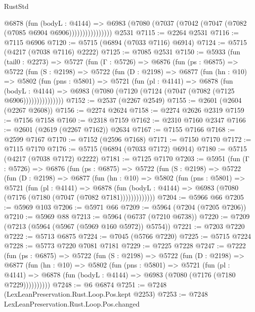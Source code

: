 \begin{lexlean}{RustStd}
\begin{coremodule}
                    @6878
                      (fun (bodyL : @4144) =>
                      @6983 (@7080 (@7037 (@7042 (@7047 (@7082 (@7085 @6904 @6906))))))))))))))))
    @2531
@7115 := @2264 @2531
@7116 := @7115 @6906
@7120 := @5715 (@6894 (@7033 @7116) @6914)
@7124 := @5715 (@4217 (@7038 @7116) @2222)
@7125 := @7085 @2531
@7150 := @5933
    (fun (tail0 : @2273) =>
    @5727
      (fun (Γ : @5726) =>
      @6876
        (fun (ps : @6875) =>
        @5722
          (fun (S : @2198) =>
          @5722
            (fun (D : @2198) =>
            @6877
              (fun (hn : @10) =>
              @5802
                (fun (pns : @5801) =>
                @5721
                  (fun (pl : @4141) =>
                  @6878
                    (fun (bodyL : @4144) =>
                    @6983 (@7080 (@7120 (@7124 (@7047 (@7082 (@7125 @6906)))))))))))))))
@7152 := @2537 (@2267 @2549)
@7155 := @2601 (@2604 (@2267 @2608))
@7156 := @2274 @2624
@7158 := @2274 @2626 @2319
@7159 := @7156 @7158
@7160 := @2318 @7159
@7162 := @2310 @7160 @2347
@7166 := @2601 (@2619 (@2267 @7162)) @2634
@7167 := @7155 @7166
@7168 := @2599 @7167
@7170 := @7152 (@2596 @7168)
@7171 := @7150 @7170
@7172 := @7115 @7170
@7176 := @5715 (@6894 (@7033 @7172) @6914)
@7180 := @5715 (@4217 (@7038 @7172) @2222)
@7181 := @7125 @7170
@7203 := @5951
    (fun (Γ : @5726) =>
    @6876
      (fun (ps : @6875) =>
      @5722
        (fun (S : @2198) =>
        @5722
          (fun (D : @2198) =>
          @6877
            (fun (hn : @10) =>
            @5802
              (fun (pns : @5801) =>
              @5721
                (fun (pl : @4141) =>
                @6878
                  (fun (bodyL : @4144) =>
                  @6983 (@7080 (@7176 (@7180 (@7047 (@7082 @7181)))))))))))))
@7204 := @5966 @66
@7205 := @5969 @103
@7206 := @5971 @66
@7209 := @5964 (@7204 (@7205 @7206))
@7210 := @5969 @88
@7213 := @5964 (@6737 (@7210 @6738))
@7220 := @7209 (@7213 (@5964 (@5967 (@5969 @160 @5972)) @5754))
@7221 := @7203 @7220
@7222 := @5713 @6875
@7224 := @7045 (@5766 @7220)
@7225 := @5715 @7224
@7228 := @5773 @7220 @7081 @7181
@7229 := @7225 @7228
@7247 := @7222
    (fun (ps : @6875) =>
    @5722
      (fun (S : @2198) =>
      @5722
        (fun (D : @2198) =>
        @6877
          (fun (hn : @10) =>
          @5802
            (fun (pns : @5801) =>
            @5721
              (fun (pl : @4141) =>
              @6878 (fun (bodyL : @4144) => @6983 (@7080 (@7176 (@7180 @7229))))))))))
@7248 := @6 @6874
@7251 := @7248 (LexLeanPreservation.Rust.Loop.Pos.kept @2253)
@7253 := @7248 LexLeanPreservation.Rust.Loop.Pos.changed

\end{coremodule}
\end{lexlean}
